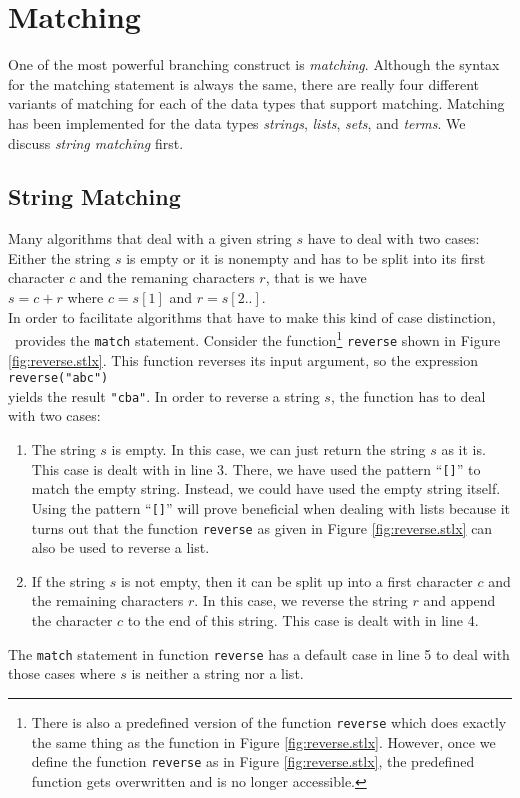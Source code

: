 \section{Matching}
One of the most powerful branching construct is \emph{matching}.  Although the syntax for the
matching statement is always the same, there are really four different variants of matching for each of the
data types that support matching.  Matching has been implemented for the data types
 \emph{strings}, \emph{lists}, \emph{sets}, and \emph{terms}.  We discuss \emph{string matching} first.

\subsection{String Matching}
Many algorithms that deal with a given string $s$ have to deal with two cases:  Either the string $s$ is
empty or it is nonempty and has to be split into its first character $c$ and the remaning characters $r$,
that is we have 
\\[0.2cm]
\hspace*{1.3cm}
$s = c + r$ \quad where $c = s[1]$ and $r = s[2..]$.
\\[0.2cm]
In order to facilitate algorithms that have to make this kind of case distinction, \setlx\ provides the
\texttt{match} statement.  Consider the function\footnote{
There is also a predefined version of the function \texttt{reverse} which does exactly the
same thing as the function in Figure \ref{fig:reverse.stlx}.  However, once we define the
function \texttt{reverse} as in Figure \ref{fig:reverse.stlx}, the predefined function
gets overwritten and is no longer accessible.}
 \texttt{reverse} shown in Figure \ref{fig:reverse.stlx}.
This function reverses its input argument, so the expression
\\[0.2cm]
\hspace*{1.3cm}
\texttt{reverse("abc")}
\\[0.2cm]
yields the result \texttt{"cba"}.  In order to reverse a string $s$, the function has to deal with two
cases:
\begin{enumerate}
\item The string $s$ is empty.  In this case, we can just return the string $s$ as it is.
      This case is dealt with in line 3.  There, we have used the pattern ``\texttt{[]}'' to match
      the empty string.  Instead, we could have used the empty string itself.  Using the pattern
      ``\texttt{[]}'' will prove beneficial when dealing with lists because it turns out that the
      function
      \texttt{reverse} as given in Figure \ref{fig:reverse.stlx} can also be used to reverse a list.
\item If the string $s$ is not empty, then it can be split up into a first character $c$ and the remaining
      characters $r$.  In this case, we reverse the string $r$ and append the character $c$ to the end of
      this string.  This case is dealt with in line 4.
\end{enumerate}
The \texttt{match} statement in function \texttt{reverse}  has a default case in line 5 to deal with
those cases where $s$ is neither a string nor a list. 

